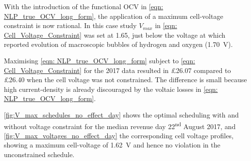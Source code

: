 \documentclass[preprint,3p,review,authoryear,10pt]{elsarticle}
\begin{document}
With the introduction of the functional OCV in \cref{eqn: NLP_true_OCV_long_form}, the application of a maximum cell-voltage constraint is now rational. In this case study $V_{max}$ in \cref{eqn: Cell_Voltage_Constraint} was set at 1.65, just below the voltage at which \cite{Wei2017} reported evolution of macroscopic bubbles of hydrogen and oxygen (\SI{1.70}{\volt}). 

Maximising \cref{eqn: NLP_true_OCV_long_form} subject to \cref{eqn: Cell_Voltage_Constraint} for the 2017 data resulted in \pounds 26.07 compared to \pounds 26.40 when the cell voltage was not constrained. The difference is small because high current-density is already discouraged by the voltaic losses in \cref{eqn: NLP_true_OCV_long_form}. 

\cref{fig:V_max_schedules_no_effect_day} shows the optimal scheduling with and without voltage constraint for the median revenue day 22\textsuperscript{nd} August 2017, and \cref{fig:V_max_voltages_no_effect_day} the corresponding cell voltage profiles, showing a maximum cell-voltage of \SI{1.62}{\volt} and hence no violation in the unconstrained schedule.
\end{document}
